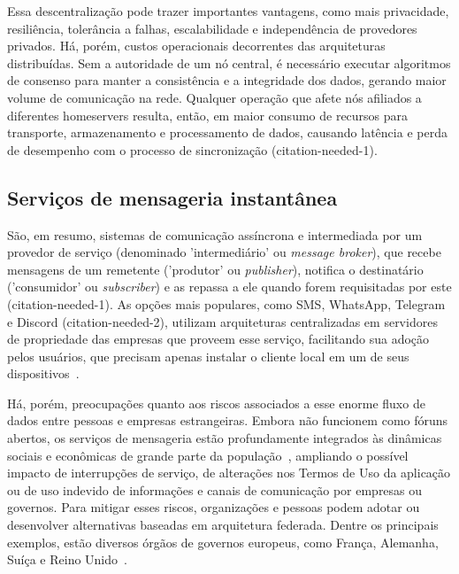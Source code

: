	Essa descentralização pode trazer importantes vantagens, como mais privacidade, resiliência, tolerância a falhas, escalabilidade e independência de provedores privados. Há, porém, custos operacionais decorrentes das arquiteturas distribuídas. Sem a autoridade de um nó central, é necessário executar algoritmos de consenso para manter a consistência e a integridade dos dados, gerando maior volume de comunicação na rede. Qualquer operação que afete nós afiliados a diferentes homeservers resulta, então, em maior consumo de recursos para transporte, armazenamento e processamento de dados, causando latência e perda de desempenho com o processo de sincronização (citation-needed-1).

\subsection{Serviços de mensageria instantânea}

	São, em resumo, sistemas de comunicação assíncrona e intermediada por um provedor de serviço (denominado 'intermediário' ou \textit{message broker}), que recebe mensagens de um remetente ('produtor' ou \textit{publisher}), notifica o destinatário ('consumidor' ou \textit{subscriber}) e as repassa a ele quando forem requisitadas por este (citation-needed-1). As opções mais populares, como SMS, WhatsApp, Telegram e Discord (citation-needed-2), utilizam arquiteturas centralizadas em servidores de propriedade das empresas que proveem esse serviço, facilitando sua adoção pelos usuários, que precisam apenas instalar o cliente local em um de seus dispositivos~\parencite{shipley-bowker-communication}.
    
    Há, porém, preocupações quanto aos riscos associados a esse enorme fluxo de dados entre pessoas e empresas estrangeiras. Embora não funcionem como fóruns abertos, os serviços de mensageria estão profundamente integrados às dinâmicas sociais e econômicas de grande parte da população~\parencite{whatsapp-plataformizacao}, ampliando o possível impacto de interrupções de serviço, de alterações nos Termos de Uso da aplicação ou de uso indevido de informações e canais de comunicação por empresas ou governos. Para mitigar esses riscos, organizações e pessoas podem adotar ou desenvolver alternativas baseadas em arquitetura federada. Dentre os principais exemplos, estão diversos órgãos de governos europeus, como França, Alemanha, Suíça e Reino Unido~\parencite{matrix-europe}.
	
